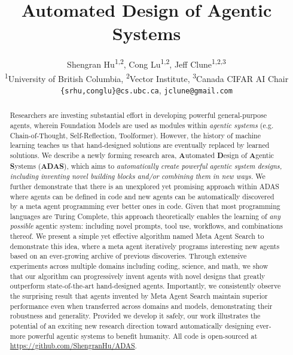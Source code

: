 \documentclass{article}
\title{Automated Design of Agentic Systems}
\author{Shengran Hu\textsuperscript{1,2}, Cong Lu\textsuperscript{1,2}, Jeff Clune\textsuperscript{1,2,3} \vspace{0.1cm}\\
\textsuperscript{1}University of British Columbia,
\textsuperscript{2}Vector Institute,
\textsuperscript{3}Canada CIFAR AI Chair \vspace{0.1cm} \\
\texttt{\{srhu,conglu\}@cs.ubc.ca}, \texttt{jclune@gmail.com} \\
}
\newcommand{\problem}{ADAS\xspace}
\newcommand{\ouralgo}{Meta Agent Search\xspace}
\begin{document}
\maketitle

\begin{abstract}
Researchers are investing substantial effort in developing powerful general-purpose agents, wherein Foundation Models are used as modules within \emph{agentic systems} (e.g. Chain-of-Thought, Self-Reflection, Toolformer).
However, the history of machine learning teaches us that hand-designed solutions are eventually replaced by learned solutions.
We describe a newly forming research area, \textbf{A}utomated \textbf{D}esign of \textbf{A}gentic \textbf{S}ystems (\textbf{\problem}), which aims to \emph{automatically create powerful agentic system designs, including inventing novel building blocks and/or combining them in new ways.}
We further demonstrate that there is an unexplored yet promising approach within \problem where agents can be defined in code and new agents can be automatically discovered by a meta agent programming ever better ones in code.
Given that most programming languages are Turing Complete, this approach theoretically enables the learning of \emph{any possible} agentic system: including novel prompts, tool use, workflows, and combinations thereof.
We present a simple yet effective algorithm named \ouralgo to demonstrate this idea, where a meta agent iteratively programs interesting new agents based on an ever-growing archive of previous discoveries.
Through extensive experiments across multiple domains including coding, science, and math, we show that our algorithm can progressively invent agents with novel designs that greatly outperform state-of-the-art hand-designed agents.
Importantly, we consistently observe the surprising result that agents invented by \ouralgo maintain superior performance even when transferred across domains and models, demonstrating their robustness and generality. Provided we develop it safely, our work illustrates the potential of an exciting new research direction toward automatically designing ever-more powerful agentic systems to benefit humanity. All code is open-sourced at \href{https://github.com/ShengranHu/ADAS}{https://github.com/ShengranHu/ADAS}.
\end{abstract}
\end{document}

